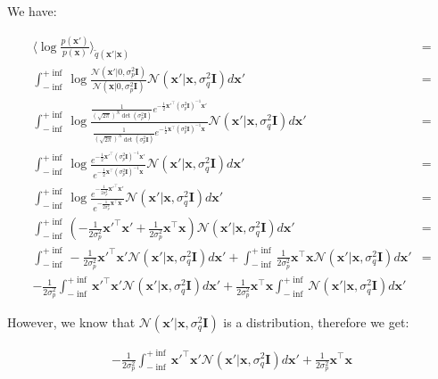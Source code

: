 \documentclass[11pt,a4paper,oneside]{report}
\begin{document}
We have:

\begin{align*}
\langle\log \frac{p(\mathbf{x}')}{p(\mathbf{x})}\rangle_{\tilde{q}(\mathbf{x}'|\mathbf{x})}&=\\
\int_{-\inf}^{+\inf} \log \frac{\mathcal{N}(\mathbf{x}'|0,\sigma_p^2\mathbf{I})}{\mathcal{N}(\mathbf{x}|0,\sigma_p^2\mathbf{I})}\mathcal{N}(\mathbf{x}'|\mathbf{x},\sigma_q^2\mathbf{I})d\mathbf{x}'&=\\
\int_{-\inf}^{+\inf} \log \frac{\frac{1}{(\sqrt{2\pi})^N\det(\sigma_p^2\mathbf{I})}e^{-\frac{1}{2}\mathbf{x'}^\top(\sigma_p^2\mathbf{I})^{-1}\mathbf{x'}}}{\frac{1}{(\sqrt{2\pi})^N\det(\sigma_p^2\mathbf{I})}e^{-\frac{1}{2}\mathbf{x}^\top(\sigma_p^2\mathbf{I})^{-1}\mathbf{x}}}\mathcal{N}(\mathbf{x}'|\mathbf{x},\sigma_q^2\mathbf{I})d\mathbf{x}'&=\\
\int_{-\inf}^{+\inf} \log \frac{e^{-\frac{1}{2}\mathbf{x'}^\top(\sigma_p^2\mathbf{I})^{-1}\mathbf{x'}}}{e^{-\frac{1}{2}\mathbf{x}^\top(\sigma_p^2\mathbf{I})^{-1}\mathbf{x}}}\mathcal{N}(\mathbf{x}'|\mathbf{x},\sigma_q^2\mathbf{I})d\mathbf{x}'&=\\
\int_{-\inf}^{+\inf} \log \frac{e^{-\frac{1}{2\sigma_p^2}\mathbf{x'}^\top\mathbf{x'}}}{e^{-\frac{1}{2\sigma_p^2}\mathbf{x}^\top\mathbf{x}}}\mathcal{N}(\mathbf{x}'|\mathbf{x},\sigma_q^2\mathbf{I})d\mathbf{x}'&=\\
\int_{-\inf}^{+\inf} \left(-\frac{1}{2\sigma_p^2}\mathbf{x'}^\top\mathbf{x'}+\frac{1}{2\sigma_p^2}\mathbf{x}^\top\mathbf{x}\right)\mathcal{N}(\mathbf{x}'|\mathbf{x},\sigma_q^2\mathbf{I})d\mathbf{x}'&=\\
\int_{-\inf}^{+\inf} -\frac{1}{2\sigma_p^2}\mathbf{x'}^\top\mathbf{x'}\mathcal{N}(\mathbf{x}'|\mathbf{x},\sigma_q^2\mathbf{I})d\mathbf{x}' + \int_{-\inf}^{+\inf}\frac{1}{2\sigma_p^2}\mathbf{x}^\top\mathbf{x} \mathcal{N}(\mathbf{x}'|\mathbf{x},\sigma_q^2\mathbf{I})d\mathbf{x}'&=\\
-\frac{1}{2\sigma_p^2}\int_{-\inf}^{+\inf} \mathbf{x'}^\top\mathbf{x'}\mathcal{N}(\mathbf{x}'|\mathbf{x},\sigma_q^2\mathbf{I})d\mathbf{x}' + \frac{1}{2\sigma_p^2}\mathbf{x}^\top\mathbf{x} \int_{-\inf}^{+\inf} \mathcal{N}(\mathbf{x}'|\mathbf{x},\sigma_q^2\mathbf{I})d\mathbf{x}'
\end{align*}

However, we know that $\mathcal{N}(\mathbf{x}'|\mathbf{x},\sigma_q^2\mathbf{I})$ is a distribution, therefore we get:

\begin{align*}
-\frac{1}{2\sigma_p^2}\int_{-\inf}^{+\inf} \mathbf{x'}^\top\mathbf{x'}\mathcal{N}(\mathbf{x}'|\mathbf{x},\sigma_q^2\mathbf{I})d\mathbf{x}' + \frac{1}{2\sigma_p^2}\mathbf{x}^\top\mathbf{x}
\end{align*}
\end{document}
